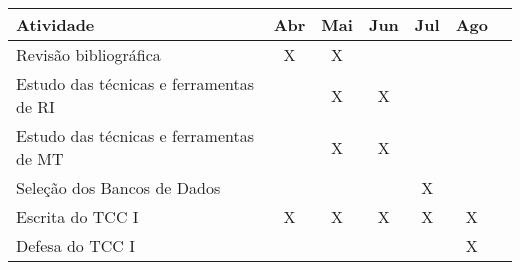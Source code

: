 


    \centering
    \begin{adjustbox}{max width=\textwidth}
    \begin{tabular}{p{7.5cm}|c|c|c|c|c|c}
        \toprule
        \textbf{Atividade}                          & Abr & Mai & Jun & Jul & Ago \\ \hline
        Revisão bibliográfica                       & X & X & & & \\ \hline
        Estudo das técnicas e ferramentas de RI     & & X & X & & \\ \hline
        Estudo das técnicas e ferramentas de MT     & & X & X & & \\ \hline
        Seleção dos Bancos de Dados                 & & & & X & \\ \hline
        Escrita do TCC I                            & X & X & X & X & X \\ \hline
        Defesa do TCC I                             & & & & & X \\
        \bottomrule
    \end{tabular}
    \end{adjustbox}
